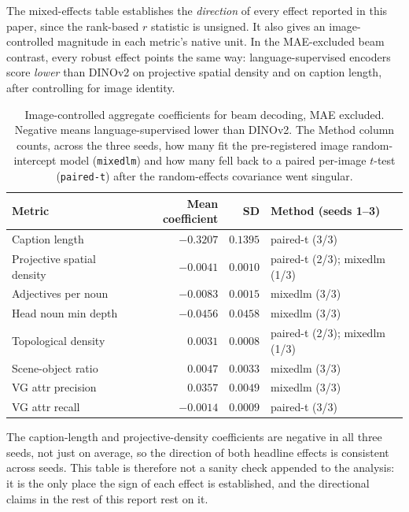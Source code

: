 \documentclass[11pt]{article}
\newcommand{\code}[1]{\texttt{#1}}
\begin{document}
The mixed-effects table establishes the \emph{direction} of every effect
reported in this paper, since the rank-based \(r\) statistic is unsigned.
It also gives an image-controlled magnitude in each metric's native unit. In the MAE-excluded beam contrast, every robust
effect points the same way: language-supervised encoders score \emph{lower}
than DINOv2 on projective spatial density and on caption length, after
controlling for image identity.

\begin{table}[!htbp]
\centering
\caption{Image-controlled aggregate coefficients for beam decoding, MAE excluded.
Negative means language-supervised lower than DINOv2. The Method column counts,
across the three seeds, how many fit the pre-registered image random-intercept
model (\code{mixedlm}) and how many fell back to a paired per-image \(t\)-test
(\code{paired-t}) after the random-effects covariance went singular.}
\label{tab:mixed-effects}
\begin{tabular}{@{}lrrl@{}}
\toprule
Metric & Mean coefficient & SD & Method (seeds 1--3) \\
\midrule
Caption length & \(-0.3207\) & \(0.1395\) & paired-t (3/3) \\
Projective spatial density & \(-0.0041\) & \(0.0010\) & paired-t (2/3); mixedlm (1/3) \\
Adjectives per noun & \(-0.0083\) & \(0.0015\) & mixedlm (3/3) \\
Head noun min depth & \(-0.0456\) & \(0.0458\) & mixedlm (3/3) \\
Topological density & \(0.0031\) & \(0.0008\) & paired-t (2/3); mixedlm (1/3) \\
Scene-object ratio & \(0.0047\) & \(0.0033\) & mixedlm (3/3) \\
VG attr precision & \(0.0357\) & \(0.0049\) & mixedlm (3/3) \\
VG attr recall & \(-0.0014\) & \(0.0009\) & paired-t (3/3) \\
\bottomrule
\end{tabular}
\end{table}

The caption-length and projective-density coefficients are negative in all
three seeds, not just on average, so the direction of both headline effects is
consistent across seeds. This table is therefore not a sanity check appended to
the analysis: it is the only place the sign of each effect is established, and
the directional claims in the rest of this report rest on it.
\end{document}
